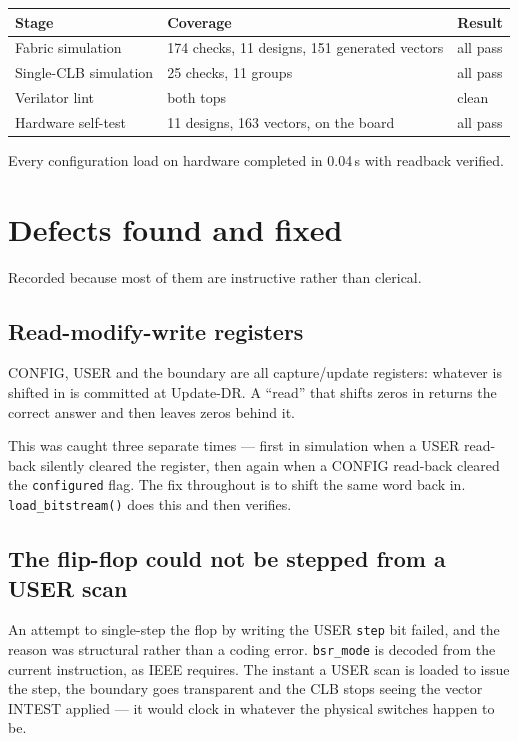 \documentclass[11pt,a4paper]{article}
\newcommand{\sig}[1]{\texttt{#1}}
\begin{document}
\begin{center}
\begin{tabular}{lll}
\toprule
\textbf{Stage} & \textbf{Coverage} & \textbf{Result} \\
\midrule
Fabric simulation      & 174 checks, 11 designs, 151 generated vectors & all pass \\
Single-CLB simulation  & 25 checks, 11 groups                          & all pass \\
Verilator lint         & both tops                                     & clean \\
Hardware self-test     & 11 designs, 163 vectors, on the board         & all pass \\
\bottomrule
\end{tabular}
\end{center}

Every configuration load on hardware completed in 0.04\,s with readback
verified.

\section{Defects found and fixed}
\label{sec:defects}

Recorded because most of them are instructive rather than clerical.

\subsection{Read-modify-write registers}

CONFIG, USER and the boundary are all capture/update registers: whatever is
shifted in is committed at Update-DR. A ``read'' that shifts zeros in returns
the correct answer and then leaves zeros behind it.

This was caught three separate times --- first in simulation when a USER
read-back silently cleared the register, then again when a CONFIG read-back
cleared the \sig{configured} flag. The fix throughout is to shift the same word
back in. \texttt{load\_bitstream()} does this and then verifies.

\subsection{The flip-flop could not be stepped from a USER scan}

An attempt to single-step the flop by writing the USER \sig{step} bit failed,
and the reason was structural rather than a coding error. \sig{bsr\_mode} is
decoded from the current instruction, as IEEE requires. The instant a USER scan
is loaded to issue the step, the boundary goes transparent and the CLB stops
seeing the vector INTEST applied --- it would clock in whatever the physical
switches happen to be.
\end{document}
